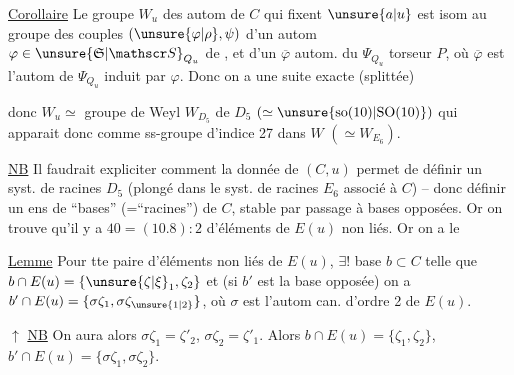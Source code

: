 \uline{Corollaire} Le groupe  $W_u$  des autom de $C$ qui fixent $\unsure{a|u}$ est  isom au groupe des couples $(\unsure{\varphi|\rho},\psi)$ d'un autom $\varphi\in\unsure{\mathfrak S|\mathscr S}_{Q_u}$ de , et d'un $\overline{\varphi}$ autom. du  $\Psi_{Q_u}$ torseur $P$, où $\overline{\varphi}$ est l'autom de $\Psi_{Q_u}$ induit par $\varphi$. Donc on a une suite exacte (splittée)


donc $W_u\simeq$ groupe de Weyl $W_{D_5}$ de $D_5$ $(\simeq\unsure{\mathrm{so}(10)|\mathrm{SO}(10)})$ qui apparait donc comme ss-groupe d'indice 27 dans $W$ $(\simeq W_{E_6})$.

\uline{NB} Il faudrait expliciter comment la donnée de $(C,u)$ permet de définir un syst. de racines $D_5$ (plongé dans le syst. de racines $E_6$ associé à $C$) -- donc définir un ens de  ``bases'' (=``racines'') de $C$, stable par passage à bases opposées. Or on trouve qu'il y a $40=(10.8):2$    d'éléments de $E(u)$ non liés. Or on a le

\uline{Lemme} Pour tte paire  d'éléments non liés de
$E(u)$, $\exists!$ base $b\subset C$ telle que $b\cap E(u)=\{\unsure{\zeta|\xi}_1,\zeta_2\}$ et (si $b'$ est la base opposée) on a $b'\cap E(u)=\{\sigma\zeta_1,\sigma\zeta_{\unsure{1|2}}\}$,  où $\sigma$ est l'autom can. d'ordre 2 de $E(u)$.

$\uparrow$ \uline{NB} On aura alors $\sigma\zeta_1=\zeta'_2$, $\sigma\zeta_2=\zeta'_1$. Alors $b\cap E(u)=\{\zeta_1,\zeta_2\}$, $b'\cap E(u)=\{\sigma\zeta_1,\sigma\zeta_2\}$.

